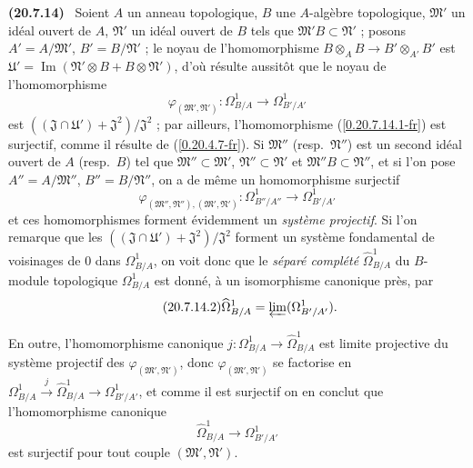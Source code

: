 \documentclass[10pt,oneside]{book}
\makeatletter
\newcommand{\sref}[1]{(\ref{#1})}
\newcommand{\setmanualcurrentlabel}[1]{\def\@currentlabel{#1}}
\newcommand{\oldpage}[2][]{%
  \setcounter{footnote}{0}%
  \marginpar{\scriptsize\textbf{#1}~|~#2}\ignorespaces}
\newenvironment{env}[1][]{\setmanualcurrentlabel{#1}\par\medskip\noindent\textbf{(#1)}\ }{\par}
\makeatother
\begin{document}
\begin{env}[20.7.14]
\label{0.20.7.14-fr}
Soient $A$ un anneau topologique, $B$ une $A$-algèbre topologique,
$\mathfrak{M}'$ un idéal ouvert de $A$, $\mathfrak{N}'$ un idéal ouvert de
$B$ tels que $\mathfrak{M}'B\subset\mathfrak{N}'$ ; posons
$A'=A/\mathfrak{M}'$,
\oldpage[0\textsubscript{IV-1}]{151}
$B'=B/\mathfrak{N}'$ ; le noyau de l'homomorphisme
$B\otimes_A B\to B'\otimes_{A'}B'$ est
$\mathfrak{U}'=\operatorname{Im}(\mathfrak{N}'\otimes B+B\otimes\mathfrak{N}')$,
d'où résulte aussitôt que le noyau de l'homomorphisme
\begin{equation}
\tag{20.7.14.1}
\label{0.20.7.14.1-fr}
  \varphi_{(\mathfrak{M}',\mathfrak{N}')}:
  \Omega^1_{B/A}\to\Omega^1_{B'/A'}
\end{equation}
est $((\mathfrak{J}\cap\mathfrak{U}')+\mathfrak{J}^2)/\mathfrak{J}^2$ ; par
ailleurs, l'homomorphisme \sref{0.20.7.14.1-fr} est surjectif, comme il
résulte de \sref{0.20.4.7-fr}. Si $\mathfrak{M}''$ (resp.\
$\mathfrak{N}''$) est un second idéal ouvert de $A$ (resp.\ $B$) tel que
$\mathfrak{M}''\subset\mathfrak{M}'$, $\mathfrak{N}''\subset\mathfrak{N}'$
et $\mathfrak{M}''B\subset\mathfrak{N}''$, et si l'on pose
$A''=A/\mathfrak{M}''$, $B''=B/\mathfrak{N}''$, on a de même un
homomorphisme surjectif
\[
  \varphi_{(\mathfrak{M}'',\mathfrak{N}''),(\mathfrak{M}',\mathfrak{N}')}:
  \Omega^1_{B''/A''}\to\Omega^1_{B'/A'}
\]
et ces homomorphismes forment évidemment un \emph{système projectif}. Si
l'on remarque que les
$((\mathfrak{J}\cap\mathfrak{U}')+\mathfrak{J}^2)/\mathfrak{J}^2$ forment
un système fondamental de voisinages de $0$ dans $\Omega^1_{B/A}$, on voit
donc que le \emph{séparé complété} $\widehat{\Omega}^1_{B/A}$ du $B$-module
topologique $\Omega^1_{B/A}$ est donné, à un isomorphisme canonique près, par
\begin{equation}
\tag{20.7.14.2}
\label{0.20.7.14.2-fr}
  \widehat{\Omega}^1_{B/A}=\varprojlim(\Omega^1_{B'/A'}).
\end{equation}

En outre, l'homomorphisme canonique
$j:\Omega^1_{B/A}\to\widehat{\Omega}^1_{B/A}$ est limite projective du
système projectif des $\varphi_{(\mathfrak{M}',\mathfrak{N}')}$, donc
$\varphi_{(\mathfrak{M}',\mathfrak{N}')}$ se factorise en
$\Omega^1_{B/A}\xrightarrow{j}\widehat{\Omega}^1_{B/A}\to
\Omega^1_{B'/A'}$, et comme il est surjectif on en conclut que
l'homomorphisme canonique
\begin{equation}
\tag{20.7.14.3}
\label{0.20.7.14.3-fr}
  \widehat{\Omega}^1_{B/A}\to\Omega^1_{B'/A'}
\end{equation}
est surjectif pour tout couple $(\mathfrak{M}',\mathfrak{N}')$.


\end{env}
\end{document}
